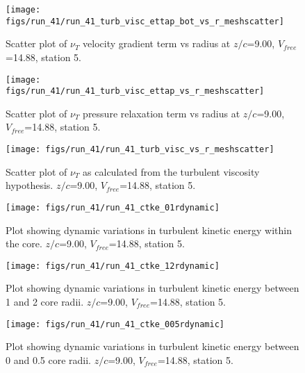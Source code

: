 \begin{figure}[H]
\centering
\texttt{[image: figs/run\_41/run\_41\_turb\_visc\_ettap\_bot\_vs\_r\_meshscatter]}
\caption{Scatter plot of $\nu_T$ velocity gradient term vs radius at $z/c$=9.00, $V_{free}$=14.88, station 5.}
\end{figure}


\begin{figure}[H]
\centering
\texttt{[image: figs/run\_41/run\_41\_turb\_visc\_ettap\_vs\_r\_meshscatter]}
\caption{Scatter plot of $\nu_T$ pressure relaxation term vs radius at $z/c$=9.00, $V_{free}$=14.88, station 5.}
\end{figure}


\begin{figure}[H]
\centering
\texttt{[image: figs/run\_41/run\_41\_turb\_visc\_vs\_r\_meshscatter]}
\caption{Scatter plot of $\nu_T$ as calculated from the turbulent viscosity hypothesis. $z/c$=9.00, $V_{free}$=14.88, station 5.}
\end{figure}


\begin{figure}[H]
\centering
\texttt{[image: figs/run\_41/run\_41\_ctke\_01rdynamic]}
\caption{Plot showing dynamic variations in turbulent kinetic energy within the core. $z/c$=9.00, $V_{free}$=14.88, station 5.}
\end{figure}


\begin{figure}[H]
\centering
\texttt{[image: figs/run\_41/run\_41\_ctke\_12rdynamic]}
\caption{Plot showing dynamic variations in turbulent kinetic energy between 1 and 2 core radii. $z/c$=9.00, $V_{free}$=14.88, station 5.}
\end{figure}


\begin{figure}[H]
\centering
\texttt{[image: figs/run\_41/run\_41\_ctke\_005rdynamic]}
\caption{Plot showing dynamic variations in turbulent kinetic energy between 0 and 0.5 core radii. $z/c$=9.00, $V_{free}$=14.88, station 5.}
\end{figure}


